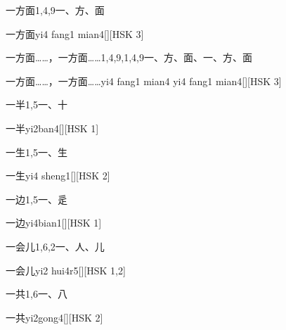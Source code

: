 \begin{entry}{一方面}{1,4,9}{⼀、⽅、⾯}
  \begin{phonetics}{一方面}{yi4 fang1 mian4}[][HSK 3]
  \end{phonetics}
\end{entry}

\begin{entry}{一方面……，一方面……}{1,4,9,1,4,9}{⼀、⽅、⾯、⼀、⽅、⾯}
  \begin{phonetics}{一方面……，一方面……}{yi4 fang1 mian4 yi4 fang1 mian4}[][HSK 3]
  \end{phonetics}
\end{entry}

\begin{entry}{一半}{1,5}{⼀、⼗}
  \begin{phonetics}{一半}{yi2ban4}[][HSK 1]
  \end{phonetics}
\end{entry}

\begin{entry}{一生}{1,5}{⼀、⽣}
  \begin{phonetics}{一生}{yi4 sheng1}[][HSK 2]
  \end{phonetics}
\end{entry}

\begin{entry}{一边}{1,5}{⼀、⾡}
  \begin{phonetics}{一边}{yi4bian1}[][HSK 1]
  \end{phonetics}
\end{entry}

\begin{entry}{一会儿}{1,6,2}{⼀、⼈、⼉}
  \begin{phonetics}{一会儿}{yi2 hui4r5}[][HSK 1,2]
  \end{phonetics}
\end{entry}

\begin{entry}{一共}{1,6}{⼀、⼋}
  \begin{phonetics}{一共}{yi2gong4}[][HSK 2]
  \end{phonetics}
\end{entry}

